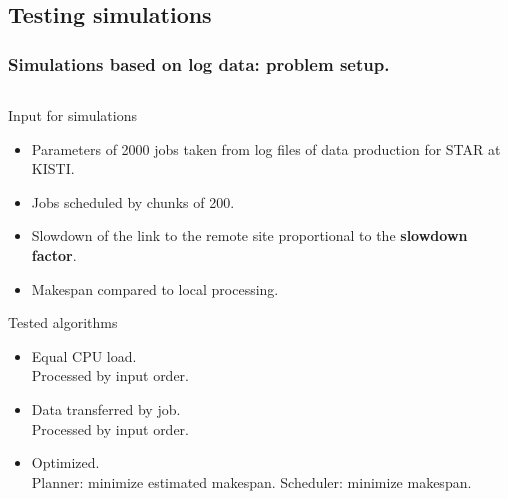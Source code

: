 \documentclass{beamer}
\begin{document}
\subsection{Testing simulations}
\begin{frame}\frametitle{Simulations based on log data: problem setup.}
\begin{columns}[c] %
    \begin{small}
\vspace{-5mm}
 		\begin{block}{Input for simulations}
		\begin{itemize}
			\item Parameters of 2000 jobs taken from log files of data production for STAR at KISTI.
			\item Jobs scheduled by chunks of 200.
			\item Slowdown of the link to the remote site proportional to the \textbf{slowdown factor}.
			\item Makespan compared to local processing.
		\end{itemize}
 	\end{block}
 		\begin{block}{Tested algorithms}
		\begin{itemize}
			\item Equal CPU load.\\ Processed by input order.
			\item Data transferred by job. \\ Processed by input order.
			\item Optimized.\\ Planner: minimize estimated makespan. Scheduler: minimize makespan.
		\end{itemize}
 	\end{block}
 	\end{small} 


\end{columns}
\end{frame}
\end{document}
